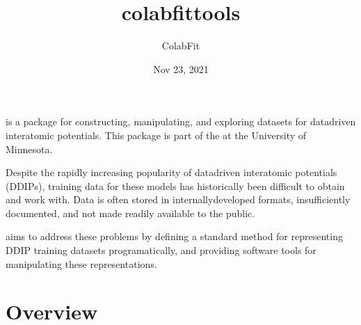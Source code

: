 \documentclass[letterpaper,10pt,english]{sphinxmanual}
\title{colabfit\sphinxhyphen{}tools}
\date{Nov 23, 2021}
\author{ColabFit}
\let\sphinxpxdimen\pdfpxdimen\else\newdimen\sphinxpxdimen
\begin{document}
\pagestyle{empty}
\sphinxmaketitle
\pagestyle{plain}
\sphinxtableofcontents
\pagestyle{normal}
\label{\detokenize{index::doc}}
\noindent{\hspace*{\fill}\sphinxincludegraphics[width=200\sphinxpxdimen,height=200\sphinxpxdimen]{{colabfit-logo}.png}\hspace*{\fill}}



\sphinxAtStartPar
{} is a package for constructing, manipulating, and
exploring datasets for data\sphinxhyphen{}driven interatomic potentials. This package is part
of the  at the University of
Minnesota.

\sphinxAtStartPar
Despite the rapidly increasing popularity of data\sphinxhyphen{}driven interatomic
potentials (DDIPs), training data for these models has historically been
difficult to obtain and work with. Data is often stored in internally\sphinxhyphen{}developed
formats, insufficiently documented, and not made readily available to the
public.

\sphinxAtStartPar
{} aims to address these problems by defining a standard
method for representing DDIP training datasets programatically, and providing
software tools for manipulating these representations.


\chapter{Overview}
\label{\detokenize{overview:overview}}\label{\detokenize{overview::doc}}
\end{document}
